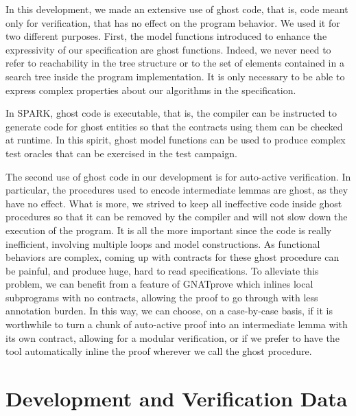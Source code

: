 \documentclass{llncs}
\newcommand{\gnatprove}{GNATprove\xspace}
\begin{document}
In this development, we made an extensive use of ghost code, that is, code meant only for verification,
that has no effect on the program behavior. We used it for two different purposes. First, the model
functions introduced to enhance the expressivity of our specification are ghost functions. Indeed, we
never need to refer to reachability in the tree structure or to the set of elements contained in a
search tree inside the program implementation. It is only necessary to be able to express complex
properties about our algorithms in the specification.

In SPARK, ghost code is executable, that is, the compiler can be instructed to generate code for ghost
entities so that the contracts using them can be checked at runtime. In this spirit, ghost model functions
can be used to produce complex test oracles that can be exercised in the test campaign.

The second use of ghost code in our development is for auto-active verification. In particular, the procedures
used to encode intermediate lemmas are ghost, as they have no effect. What is more, we strived to
keep all ineffective code inside ghost procedures so that it can be removed by the compiler and will not
slow down the execution of the program. It is all the more important since the code is really inefficient, involving
multiple loops and model constructions. As functional behaviors are complex, coming up with contracts for
these ghost procedure can be painful, and produce huge, hard to read specifications. To alleviate this
problem, we can benefit from a feature of \gnatprove which inlines local subprograms with no contracts, allowing
the proof to go through with less annotation burden. In this way, we can choose, on a case-by-case basis, if
it is worthwhile to turn a chunk of auto-active proof into an intermediate lemma with its own contract,
allowing for a modular verification, or if we prefer to have the tool automatically inline the
proof wherever we call the ghost procedure.


\section{Development and Verification Data}
\end{document}
